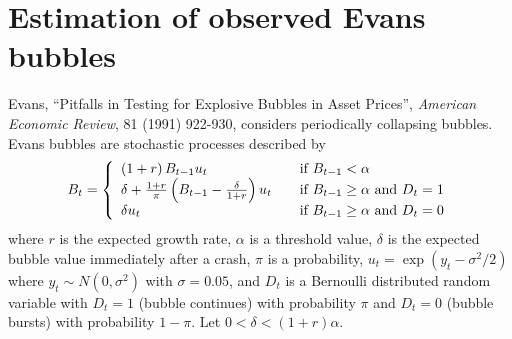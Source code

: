 \documentclass{article}
\begin{document}
\section{Estimation of observed Evans bubbles}

Evans, \textquotedblleft Pitfalls in Testing for Explosive Bubbles in Asset
Prices\textquotedblright , \emph{American Economic Review}, 81 (1991)
922-930, considers periodically collapsing bubbles. Evans bubbles are
stochastic processes described by%
\begin{equation}
B_{t}=\left\{ 
\begin{array}{ll}
\left( 1+r\right) B_{t-1}u_{t} & \text{\quad if }B_{t-1}<\alpha  \\ 
\delta +\frac{1+r}{\pi }\left( B_{t-1}-\frac{\delta }{1+r}\right) u_{t} & 
\quad \text{if }B_{t-1}\geq \alpha \text{ and }D_{t}=1 \\ 
\delta u_{t} & \quad \text{if }B_{t-1}\geq \alpha \text{ and }D_{t}=0%
\end{array}%
\right.   \label{bubble}
\end{equation}%
where $r$ is the expected growth rate, $\alpha $ is a threshold value, $%
\delta $ is the expected bubble value immediately after a crash, $\pi $ is a
probability, $u_{t}=\exp \left( y_{t}-\sigma ^{2}/2\right) $ where $%
y_{t}\sim N(0,\sigma ^{2})$ with $\sigma =0.05$, and $D_{t}$ is a Bernoulli
distributed random variable with $D_{t}=1$ (bubble continues) with
probability $\pi $ and $D_{t}=0$ (bubble bursts) with probability $1-\pi $.
Let $0<\delta <\left( 1+r\right) \alpha $.
\end{document}
